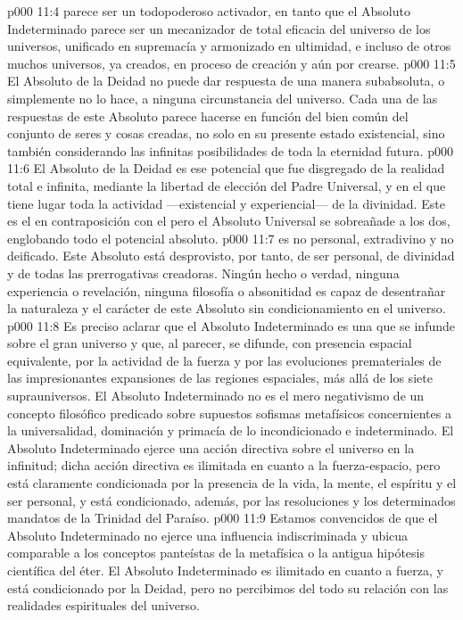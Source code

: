 \vs p000 11:4  parece ser un todopoderoso activador, en tanto que el Absoluto Indeterminado parece ser un mecanizador de total eficacia del universo de los universos, unificado en supremacía y armonizado en ultimidad, e incluso de otros muchos universos, ya creados, en proceso de creación y aún por crearse.
\vs p000 11:5 El Absoluto de la Deidad no puede dar respuesta de una manera subabsoluta, o simplemente no lo hace, a ninguna circunstancia del universo. Cada una de las respuestas de este Absoluto parece hacerse en función del bien común del conjunto de seres y cosas creadas, no solo en su presente estado existencial, sino también considerando las infinitas posibilidades de toda la eternidad futura.
\vs p000 11:6 El Absoluto de la Deidad es ese potencial que fue disgregado de la realidad total e infinita, mediante la libertad de elección del Padre Universal, y en el que tiene lugar toda la actividad ---existencial y experiencial--- de la divinidad. Este es el  en contraposición con el  pero el Absoluto Universal se sobreañade a los dos, englobando todo el potencial absoluto.
\vs p000 11:7  es no personal, extradivino y no deificado. Este Absoluto está desprovisto, por tanto, de ser personal, de divinidad y de todas las prerrogativas creadoras. Ningún hecho o verdad, ninguna experiencia o revelación, ninguna filosofía o absonitidad es capaz de desentrañar la naturaleza y el carácter de este Absoluto sin condicionamiento en el universo.
\vs p000 11:8 Es preciso aclarar que el Absoluto Indeterminado es una  que se infunde sobre el gran universo y que, al parecer, se difunde, con presencia espacial equivalente, por la actividad de la fuerza y por las evoluciones premateriales de las impresionantes expansiones de las regiones espaciales, más allá de los siete suprauniversos. El Absoluto Indeterminado no es el mero negativismo de un concepto filosófico predicado sobre supuestos sofismas metafísicos concernientes a la universalidad, dominación y primacía de lo incondicionado e indeterminado. El Absoluto Indeterminado ejerce una acción directiva sobre el universo en la infinitud; dicha acción directiva es ilimitada en cuanto a la fuerza\hyp{}espacio, pero está claramente condicionada por la presencia de la vida, la mente, el espíritu y el ser personal, y está condicionado, además, por las resoluciones y los determinados mandatos de la Trinidad del Paraíso.
\vs p000 11:9 Estamos convencidos de que el Absoluto Indeterminado no ejerce una influencia indiscriminada y ubicua comparable a los conceptos panteístas de la metafísica o la antigua hipótesis científica del éter. El Absoluto Indeterminado es ilimitado en cuanto a fuerza, y está condicionado por la Deidad, pero no percibimos del todo su relación con las realidades espirituales del universo.
